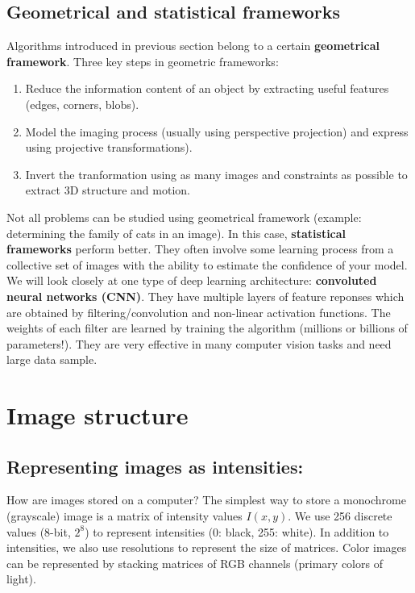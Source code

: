 \documentclass[a4paper,11pt]{article}
\begin{document}
\subsection{Geometrical and statistical frameworks}
Algorithms introduced in previous section belong to a certain \textbf{geometrical framework}. Three key steps in geometric frameworks:
\begin{enumerate}
	\item Reduce the information content of an object by extracting useful features (edges, corners, blobs).
	\item Model the imaging process (usually using perspective projection) and express using projective transformations). 
	\item Invert the tranformation using as many images and constraints as possible to extract 3D structure and motion.
\end{enumerate}
Not all problems can be studied using geometrical framework (example: determining the family of cats in an image). In this case, \textbf{statistical frameworks} perform better. They often involve some learning process from a collective set of images with the ability to estimate the confidence of your model. \\
We will look closely at one type of deep learning architecture:  \textbf{convoluted neural networks (CNN)}. They have multiple layers of feature reponses which are obtained by filtering/convolution and non-linear activation functions. The weights of each filter are learned by training the algorithm (millions or billions of parameters!). They are very effective in many computer vision tasks and need large data sample. 
	
\section{Image structure}
\subsection{Representing images as intensities:}
How are images stored on a computer? The simplest way to store a monochrome (grayscale) image is a matrix of intensity values $I(x,y)$. We use 256 discrete values (8-bit, $2^8$) to represent intensities (0: black, 255: white). In addition to intensities, we also use resolutions to represent the size of matrices. Color images can be represented by stacking matrices of RGB channels (primary colors of light).
\end{document}
